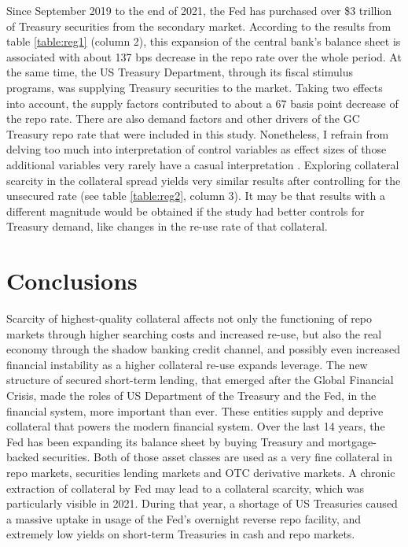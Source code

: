\documentclass[11pt,a4paper,english,oneside]{article}
\begin{document}
Since September 2019 to the end of 2021, the Fed has purchased over \$3 trillion of Treasury securities from the secondary market. According to the results from table \ref{table:reg1} (column 2), this expansion of the central bank's balance sheet is associated with about 137 bps decrease in the repo rate over the whole period. At the same time, the US Treasury Department, through its fiscal stimulus programs, was supplying Treasury securities to the market. Taking two effects into account, the supply factors contributed to about a 67 basis point decrease of the repo rate. There are also demand factors and other drivers of the GC Treasury repo rate that were included in this study. Nonetheless, I refrain from delving too much into interpretation of control variables as effect sizes of those additional variables very rarely have a casual interpretation \citep{hunermund2020}. Exploring collateral scarcity in the collateral spread yields very similar results after controlling for the unsecured rate (see table \ref{table:reg2}, column 3). It may be that results with a different magnitude would be obtained if the study had better controls for Treasury demand, like changes in the re-use rate of that collateral. 

\newpage

\section{Conclusions} \label{sec:conclusion} 

Scarcity of highest-quality collateral affects not only the functioning of repo markets through higher searching costs and increased re-use, but also the real economy through the shadow banking credit channel, and possibly even increased financial instability as a higher collateral re-use expands leverage. The new structure of secured short-term lending, that emerged after the Global Financial Crisis, made the roles of US Department of the Treasury and the Fed, in the financial system, more important than ever. These entities supply and deprive collateral that powers the modern financial system. Over the last 14 years, the Fed has been expanding its balance sheet by buying Treasury and mortgage-backed securities. Both of those asset classes are used as a very fine collateral in repo markets, securities lending markets and OTC derivative markets. A chronic extraction of collateral by Fed may lead to a collateral scarcity, which was particularly visible in 2021. During that year, a shortage of US Treasuries caused a massive uptake in usage of the Fed's overnight reverse repo facility, and extremely low yields on short-term Treasuries in cash and repo markets.
\end{document}
